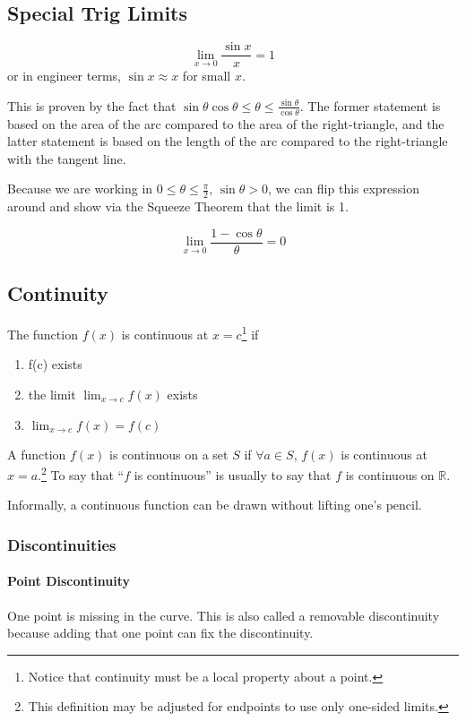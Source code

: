 \documentclass{article}
\begin{document}
\subsection{Special Trig Limits}\label{trig-limits}
$$\lim_{x\to 0} \frac{\sin{x}}{x} = 1$$ or in engineer terms, $\sin{x} \approx x$ for small $x$.

This is proven by the fact that $\sin{\theta}\cos{\theta} \le \theta \le \frac{\sin{\theta}}{\cos{\theta}}$. The former statement is based on the area of the arc compared to the area of the right-triangle, and the latter statement is based on the length of the arc compared to the right-triangle with the tangent line.

Because we are working in $0 \le \theta \le \frac{\pi}{2}$, $\sin{\theta} > 0$, we can flip this expression around and show via the Squeeze Theorem that the limit is 1.

$$\lim_{x\to 0} \frac{1-\cos{\theta}}{\theta} = 0$$

\subsection{Continuity}
The function $f(x)$ is continuous at $x=c$\footnote{Notice that continuity must be a local property about a point.} if
\begin{enumerate}
    \item f(c) exists
    \item the limit $\lim_{x\to c}\limits f(x)$ exists
    \item $\lim_{x\to c}\limits f(x) = f(c)$
\end{enumerate}
A function $f(x)$ is continuous on a set $S$ if $\forall a \in S$, $f(x)$ is continuous at $x=a$.\footnote{This definition may be adjusted for endpoints to use only one-sided limits.} To say that ``$f$ is continuous'' is usually to say that $f$ is continuous on $\mathbb{R}$.

Informally, a continuous function can be drawn without lifting one's pencil.

\subsubsection{Discontinuities}
\paragraph{Point Discontinuity} One point is missing in the curve. This is also called a removable discontinuity because adding that one point can fix the discontinuity.
\end{document}

